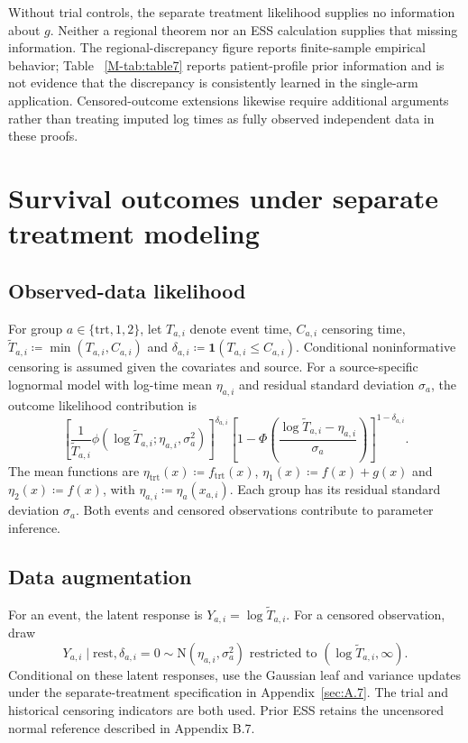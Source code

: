 \documentclass[11pt]{article}
\newcommand{\N}{\mathrm{N}}
\newcommand{\ind}{\mathbf{1}}
\theoremstyle{remark}\newtheorem{remark}{Remark}[section]
\providecommand{\DIFaddtex}[1]{{\protect\color{blue} \sf #1}} %
\providecommand{\DIFaddbegin}{} %
\providecommand{\DIFaddend}{} %
\providecommand{\DIFadd}[1]{\texorpdfstring{\DIFaddtex{#1}}{#1}} %
\begin{document}
Without trial controls, the separate treatment likelihood supplies no information about $g$. Neither a regional theorem nor an ESS calculation supplies that missing information. The regional-discrepancy figure reports finite-sample empirical behavior; Table \DIFaddbegin \DIFadd{~\ref{M-tab:table7} }\DIFaddend reports patient-profile prior information and is not evidence that the discrepancy is consistently learned in the single-arm application. Censored-outcome extensions likewise require additional arguments rather than treating imputed log times as fully observed independent data in these proofs.
 \section{Survival outcomes \DIFaddbegin \DIFadd{under separate treatment modeling}\DIFaddend }\label{sec:D}
\subsection{Observed-data likelihood}\label{sec:D.1}
For group $a\in\{\mathrm{trt},1,2\}$, let $T_{a,i}$ denote event time, $C_{a,i}$ censoring time, $\widetilde T_{a,i}\coloneqq \min(T_{a,i},C_{a,i})$ and $\delta_{a,i}\coloneqq \ind(T_{a,i}\leq C_{a,i})$. Conditional noninformative censoring is assumed given the covariates and source. For a source-specific lognormal model with log-time mean $\eta_{a,i}$ and residual standard deviation $\sigma_a$, the outcome likelihood contribution is
\begin{equation}
\left[\frac{1}{\widetilde T_{a,i}}\phi(\log\widetilde T_{a,i};\eta_{a,i},\sigma_a^2)\right]^{\delta_{a,i}}
\left[1-\Phi\left(\frac{\log\widetilde T_{a,i}-\eta_{a,i}}{\sigma_a}\right)\right]^{1-\delta_{a,i}}.
\end{equation}
The mean functions are $\eta_{\mathrm{trt}}(x)\coloneqq f_{\mathrm{trt}}(x)$, $\eta_{1}(x)\coloneqq f(x)+g(x)$ and $\eta_{2}(x)\coloneqq f(x)$, with $\eta_{a,i}\coloneqq \eta_a(x_{a,i})$. Each group has its residual standard deviation $\sigma_a$. Both events and censored observations contribute to parameter inference.

\subsection{Data augmentation}\label{sec:D.2}
For an event, the latent response is $Y_{a,i}=\log\widetilde T_{a,i}$. For a censored observation, draw
\begin{equation}
Y_{a,i}\mid\text{rest},\delta_{a,i}=0\sim
\N(\eta_{a,i},\sigma_a^2)\text{ restricted to }(\log\widetilde T_{a,i},\infty).
\end{equation}
Conditional on these latent responses, use the Gaussian leaf and variance updates  \DIFaddbegin \DIFadd{under the separate-treatment specification in Appendix~\ref{sec:A.7}}\DIFaddend . The trial and historical censoring indicators are both used. Prior ESS retains the uncensored normal reference described in Appendix B.7.
\end{document}
